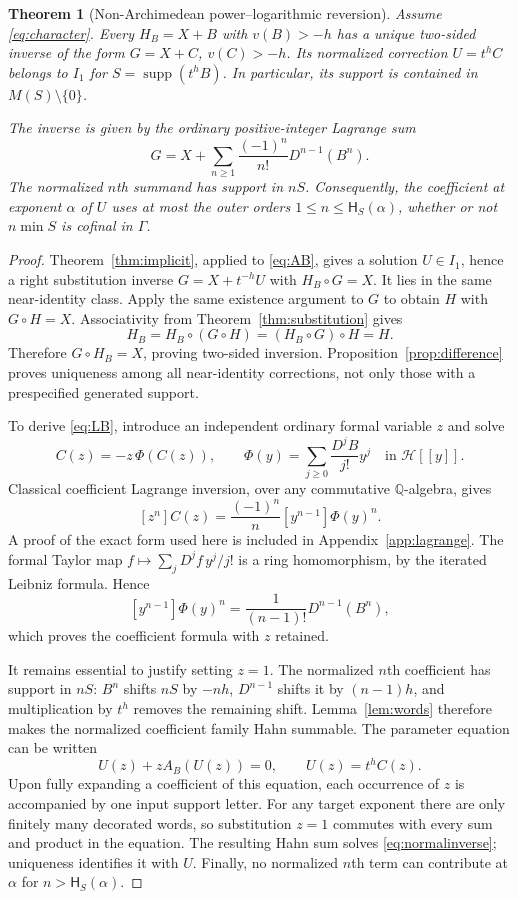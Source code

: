 \documentclass[11pt,a4paper]{article}
\newtheorem{theorem}{Theorem}[section]
\theoremstyle{definition}
\theoremstyle{remark}
\newcommand{\Q}{\mathbb Q}
\newcommand{\HH}{\mathscr H}
\newcommand{\supp}{\operatorname{supp}}
\newcommand{\depth}{\mathsf H}
\begin{document}
\begin{theorem}[Non-Archimedean power--logarithmic reversion]
\label{thm:reversion}
Assume \eqref{eq:character}. Every $H_B=X+B$ with $v(B)>-h$ has a unique
two-sided inverse of the form $G=X+C$, $v(C)>-h$. Its normalized correction
$U=t^hC$ belongs to $I_1$ for $S=\supp(t^hB)$. In particular, its support
is contained in $M(S)\setminus\{0\}$.

The inverse is given by the ordinary positive-integer Lagrange sum
\begin{equation}\label{eq:LB}
 G=X+\sum_{n\ge1}\frac{(-1)^n}{n!}D^{n-1}(B^n).
\end{equation}
The normalized $n$th summand has support in $nS$. Consequently, the
coefficient at exponent $\alpha$ of $U$ uses at most the outer orders
$1\le n\le\depth_S(\alpha)$, whether or not $n\min S$ is cofinal in
$\Gamma$.
\end{theorem}
\begin{proof}
Theorem~\ref{thm:implicit}, applied to \eqref{eq:AB}, gives a solution
$U\in I_1$, hence a right substitution inverse $G=X+t^{-h}U$ with
$H_B\circ G=X$. It lies in the same near-identity class. Apply the same
existence argument to $G$ to obtain $H$ with $G\circ H=X$.
Associativity from Theorem~\ref{thm:substitution} gives
\[
 H_B=H_B\circ(G\circ H)=(H_B\circ G)\circ H=H.
\]
Therefore $G\circ H_B=X$, proving two-sided inversion.
Proposition~\ref{prop:difference} proves uniqueness among all near-identity
corrections, not only those with a prespecified generated support.

To derive \eqref{eq:LB}, introduce an independent ordinary formal variable
$z$ and solve
\[
 C(z)=-z\,\Phi(C(z)),\qquad
 \Phi(y)=\sum_{j\ge0}\frac{D^jB}{j!}y^j
 \quad\text{in }\HH[[y]].
\]
Classical coefficient Lagrange inversion, over any commutative
$\Q$-algebra, gives
\[
 [z^n]C(z)=\frac{(-1)^n}{n}[y^{n-1}]\Phi(y)^n.
\]
A proof of the exact form used here is included in
Appendix~\ref{app:lagrange}. The formal Taylor map
$f\mapsto\sum_jD^jf\,y^j/j!$ is a ring homomorphism, by the iterated
Leibniz formula. Hence
\[
 [y^{n-1}]\Phi(y)^n=\frac{1}{(n-1)!}D^{n-1}(B^n),
\]
which proves the coefficient formula with $z$ retained.

It remains essential to justify setting $z=1$. The normalized $n$th
coefficient has support in $nS$: $B^n$ shifts $nS$ by $-nh$,
$D^{n-1}$ shifts it by $(n-1)h$, and multiplication by $t^h$ removes the
remaining shift. Lemma~\ref{lem:words} therefore makes the normalized
coefficient family Hahn summable. The parameter equation can be written
\[
 U(z)+zA_B(U(z))=0,\qquad U(z)=t^hC(z).
\]
Upon fully expanding a coefficient of this equation, each occurrence of
$z$ is accompanied by one input support letter. For any target exponent
there are only finitely many decorated words, so substitution $z=1$
commutes with every sum and product in the equation. The resulting Hahn
sum solves \eqref{eq:normalinverse}; uniqueness identifies it with $U$.
Finally, no normalized $n$th term can contribute at $\alpha$ for
$n>\depth_S(\alpha)$.
\end{proof}
\end{document}
